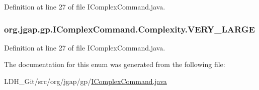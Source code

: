 Definition at line 27 of file I\-Complex\-Command.\-java.

\hypertarget{enumorg_1_1jgap_1_1gp_1_1_i_complex_command_1_1_complexity_ab639d2f5657cc33b0b2ef410d7d23a66}{
\subsubsection[{V\-E\-R\-Y\-\_\-\-L\-A\-R\-G\-E}]{\setlength{\rightskip}{0pt plus 5cm}org.\-jgap.\-gp.\-I\-Complex\-Command.\-Complexity.\-V\-E\-R\-Y\-\_\-\-L\-A\-R\-G\-E}}\label{enumorg_1_1jgap_1_1gp_1_1_i_complex_command_1_1_complexity_ab639d2f5657cc33b0b2ef410d7d23a66}


Definition at line 27 of file I\-Complex\-Command.\-java.



The documentation for this enum was generated from the following file\-:\begin{DoxyCompactItemize}
\item 
L\-D\-H\-\_\-\-Git/src/org/jgap/gp/\hyperlink{_i_complex_command_8java}{I\-Complex\-Command.\-java}\end{DoxyCompactItemize}
